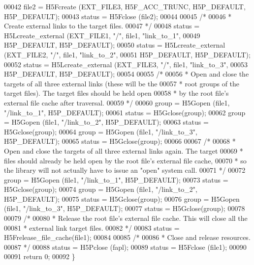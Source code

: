 \begin{DoxyCode}
00042     file2 = H5Fcreate (EXT\_FILE3, H5F\_ACC\_TRUNC, H5P\_DEFAULT, H5P\_DEFAULT);
00043     status = H5Fclose (file2);
00044 
00045     \textcolor{comment}{/*}
00046 \textcolor{comment}{     * Create external links to the target files.}
00047 \textcolor{comment}{     */}
00048     status = H5Lcreate\_external (EXT\_FILE1, \textcolor{stringliteral}{"/"}, file1, \textcolor{stringliteral}{"link\_to\_1"},
00049             H5P\_DEFAULT, H5P\_DEFAULT);
00050     status = H5Lcreate\_external (EXT\_FILE2, \textcolor{stringliteral}{"/"}, file1, \textcolor{stringliteral}{"link\_to\_2"},
00051             H5P\_DEFAULT, H5P\_DEFAULT);
00052     status = H5Lcreate\_external (EXT\_FILE3, \textcolor{stringliteral}{"/"}, file1, \textcolor{stringliteral}{"link\_to\_3"},
00053             H5P\_DEFAULT, H5P\_DEFAULT);
00054 
00055     \textcolor{comment}{/*}
00056 \textcolor{comment}{     * Open and close the targets of all three external links (these will be the}
00057 \textcolor{comment}{     * root groups of the target files).  The target files should be held open}
00058 \textcolor{comment}{     * by the root file's external file cache after traversal.}
00059 \textcolor{comment}{     */}
00060     group = H5Gopen (file1, \textcolor{stringliteral}{"/link\_to\_1"}, H5P\_DEFAULT);
00061     status = H5Gclose(group);
00062     group = H5Gopen (file1, \textcolor{stringliteral}{"/link\_to\_2"}, H5P\_DEFAULT);
00063     status = H5Gclose(group);
00064     group = H5Gopen (file1, \textcolor{stringliteral}{"/link\_to\_3"}, H5P\_DEFAULT);
00065     status = H5Gclose(group);
00066 
00067     \textcolor{comment}{/*}
00068 \textcolor{comment}{     * Open and close the targets of all three external links again.  The target}
00069 \textcolor{comment}{     * files should already be held open by the root file's external file cache,}
00070 \textcolor{comment}{     * so the library will not actually have to issue an "open" system call.}
00071 \textcolor{comment}{     */}
00072     group = H5Gopen (file1, \textcolor{stringliteral}{"/link\_to\_1"}, H5P\_DEFAULT);
00073     status = H5Gclose(group);
00074     group = H5Gopen (file1, \textcolor{stringliteral}{"/link\_to\_2"}, H5P\_DEFAULT);
00075     status = H5Gclose(group);
00076     group = H5Gopen (file1, \textcolor{stringliteral}{"/link\_to\_3"}, H5P\_DEFAULT);
00077     status = H5Gclose(group);
00078 
00079     \textcolor{comment}{/*}
00080 \textcolor{comment}{     * Release the root file's external file cache.  This will close all the}
00081 \textcolor{comment}{     * external link target files.}
00082 \textcolor{comment}{     */}
00083     status = H5Frelease\_file\_cache(file1);
00084 
00085     \textcolor{comment}{/*}
00086 \textcolor{comment}{     * Close and release resources.}
00087 \textcolor{comment}{     */}
00088     status = H5Pclose (fapl);
00089     status = H5Fclose (file1);
00090 
00091     \textcolor{keywordflow}{return} 0;
00092 \}
\end{DoxyCode}

